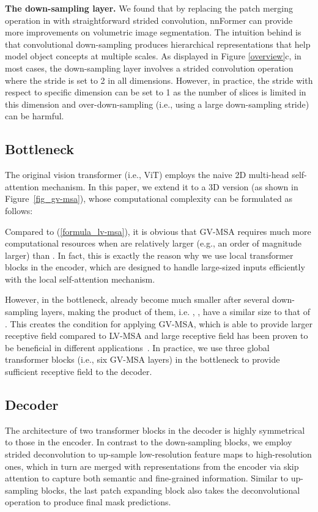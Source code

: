 \documentclass[journal,twoside,web]{ieeecolor}
\begin{document}
\noindent \textbf{The down-sampling layer.} We found that by replacing the patch merging operation in \cite{liu2021swin} with straightforward strided convolution, nnFormer can provide more improvements on volumetric image segmentation. The intuition behind is that convolutional down-sampling produces hierarchical representations that help model object concepts at multiple scales. As displayed in Figure \ref{overview}c, in most cases, the down-sampling layer involves a strided convolution operation where the stride is set to 2 in all dimensions. However, in practice, the stride with respect to specific dimension can be set to 1 as the number of slices is limited in this dimension and over-down-sampling (i.e., using a large down-sampling stride) can be harmful.

\subsection{Bottleneck}
The original vision transformer (i.e., ViT) \cite{dosovitskiy2020image} employs the naive 2D multi-head self-attention mechanism. In this paper, we extend it to a 3D version (as shown in Figure~\ref{fig_gv-msa}), whose computational complexity can be formulated as follows:

Compared to (\ref{formula_lv-msa}), it is obvious that GV-MSA requires much more computational resources when  are relatively larger (e.g., an order of magnitude larger) than . In fact, this is exactly the reason why we use local transformer blocks in the encoder, which are designed to handle large-sized inputs efficiently with the local self-attention mechanism. 

However, in the bottleneck,  already become much smaller after several down-sampling layers, making the product of them, i.e. , , have a similar size to that of . This creates the condition for applying GV-MSA, which is able to provide larger receptive field compared to LV-MSA and large receptive field has been proven to be beneficial in different applications~\cite{luo2016understanding,liu2018receptive,chen2017deeplab,szegedy2015going}. In practice, we use three global transformer blocks (i.e., six GV-MSA layers) in the bottleneck to provide sufficient receptive field to the decoder.

\subsection{Decoder}
The architecture of two transformer blocks in the decoder is highly symmetrical to those in the encoder. In contrast to the down-sampling blocks, we employ strided deconvolution to up-sample low-resolution feature maps to high-resolution ones, which in turn are merged with representations from the encoder via skip attention to capture both semantic and fine-grained information. Similar to up-sampling blocks, the last patch expanding block also takes the deconvolutional operation to produce final mask predictions.\\
\end{document}
